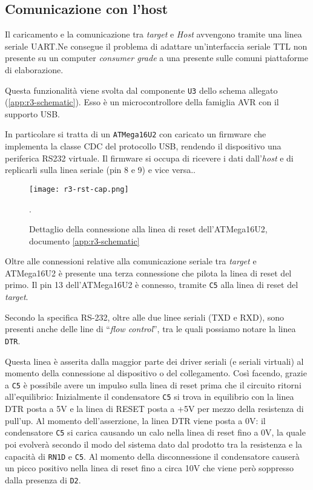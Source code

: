 \subsection{Comunicazione con l'host}

Il caricamento e la comunicazione tra \textit{target} e \textit{Host} avvengono tramite una linea seriale UART.\@ Ne consegue il problema di adattare un'interfaccia seriale TTL non presente su un computer \textit{consumer grade} a una presente sulle comuni piattaforme di elaborazione.

Questa funzionalità viene svolta dal componente \texttt{U3} dello schema allegato (\ref{app:r3-schematic}). Esso è un microcontrollore della famiglia AVR con il supporto USB.\@

In particolare si tratta di un \texttt{ATMega16U2} con caricato un firmware che implementa la classe CDC del protocollo USB, rendendo il dispositivo una periferica RS232 virtuale.
Il firmware si occupa di ricevere i dati dall'\textit{host} e di replicarli sulla linea seriale (pin 8 e 9) e vice versa.\cite[firmwares/atmegaxxu2/arduino-usbserial/]{git:arduinocore}.

\begin{figure}[t]
    \centering
    \texttt{[image: r3-rst-cap.png]}
    \caption[Dettaglio dello schema elettronico posto in appendice, documento~\ref{app:r3-schematic}]{Dettaglio della connessione alla linea di reset dell'ATMega16U2, documento \ref{app:r3-schematic}~\cite{site:r3-schematic}}\label{fig:r3-schematic-rst-detail}.
\end{figure}


Oltre alle connessioni relative alla comunicazione seriale tra \textit{target} e ATMega16U2 è presente una terza connessione che pilota la linea di reset del primo. Il pin 13 dell'ATMega16U2 è connesso, tramite \texttt{C5} alla linea di reset del \textit{target}.

Secondo la specifica RS-232, oltre alle due linee seriali (TXD e RXD), sono presenti anche delle line di ``\textit{flow control}'', tra le quali possiamo notare la linea \texttt{DTR}.

Questa linea è asserita dalla maggior parte dei driver seriali (e seriali virtuali) al momento della connessione al dispositivo o del collegamento. Così facendo, grazie a \texttt{C5} è possibile avere un impulso sulla linea di reset prima che il circuito ritorni all'equilibrio: Inizialmente il condensatore \texttt{C5} si trova in equilibrio con la linea DTR posta a 5V e la linea di RESET posta a +5V per mezzo della resistenza di pull'up. Al momento dell'asserzione, la linea DTR viene posta a 0V: il condensatore \texttt{C5} si carica causando un calo nella linea di reset fino a 0V, la quale poi evolverà secondo il modo del sistema dato dal prodotto tra la resistenza e la capacità di \texttt{RN1D} e \texttt{C5}.
Al momento della disconnessione il condensatore causerà un picco positivo nella linea di reset fino a circa 10V che viene però soppresso dalla presenza di \texttt{D2}.

